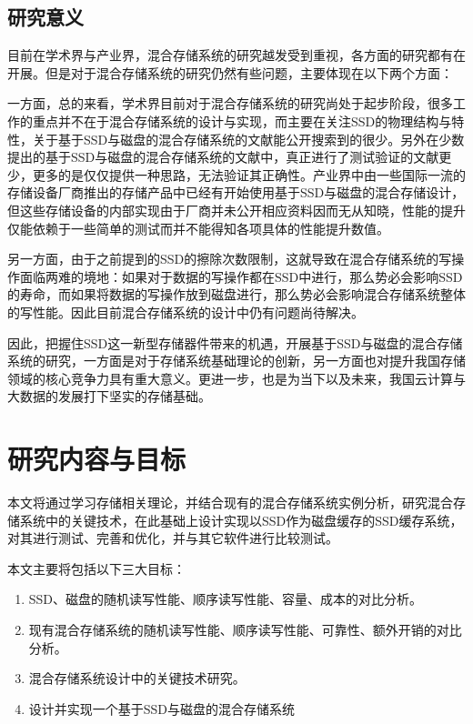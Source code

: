 \subsection{研究意义}

目前在学术界与产业界，混合存储系统的研究越发受到重视，各方面的研究都有在开展。但是对于混合存储系统的研究仍然有些问题，主要体现在以下两个方面：

一方面，总的来看，学术界目前对于混合存储系统的研究尚处于起步阶段，很多工作的重点并不在于混合存储系统的设计与实现，而主要在关注SSD的物理结构与特性，关于基于SSD与磁盘的混合存储系统的文献\cite{guerra2011cost, kim2011hybridstore, 杨濮源2012一种时间敏感的, 陈震37基于磁盘和固态硬盘的混合存储系统研究综述}能公开搜索到的很少。另外在少数提出的基于SSD与磁盘的混合存储系统的文献中，真正进行了测试验证的文献更少，更多的是仅仅提供一种思路，无法验证其正确性。产业界中由一些国际一流的存储设备厂商推出的存储产品中已经有开始使用基于SSD与磁盘的混合存储设计，但这些存储设备的内部实现由于厂商并未公开相应资料因而无从知晓，性能的提升仅能依赖于一些简单的测试而并不能得知各项具体的性能提升数值。

另一方面，由于之前提到的SSD的擦除次数限制，这就导致在混合存储系统的写操作面临两难的境地：如果对于数据的写操作都在SSD中进行，那么势必会影响SSD的寿命，而如果将数据的写操作放到磁盘进行，那么势必会影响混合存储系统整体的写性能。因此目前混合存储系统的设计中仍有问题尚待解决。

因此，把握住SSD这一新型存储器件带来的机遇，开展基于SSD与磁盘的混合存储系统的研究，一方面是对于存储系统基础理论的创新，另一方面也对提升我国存储领域的核心竞争力具有重大意义。更进一步，也是为当下以及未来，我国云计算与大数据的发展打下坚实的存储基础。

\section{研究内容与目标}

本文将通过学习存储相关理论，并结合现有的混合存储系统实例分析，研究混合存储系统中的关键技术，在此基础上设计实现以SSD作为磁盘缓存的SSD缓存系统，对其进行测试、完善和优化，并与其它软件进行比较测试。

本文主要将包括以下三大目标：
\begin{enumerate}
    \item SSD、磁盘的随机读写性能、顺序读写性能、容量、成本的对比分析。
    \item 现有混合存储系统的随机读写性能、顺序读写性能、可靠性、额外开销的对比分析。
    \item 混合存储系统设计中的关键技术研究。
    \item 设计并实现一个基于SSD与磁盘的混合存储系统
\end{enumerate}

